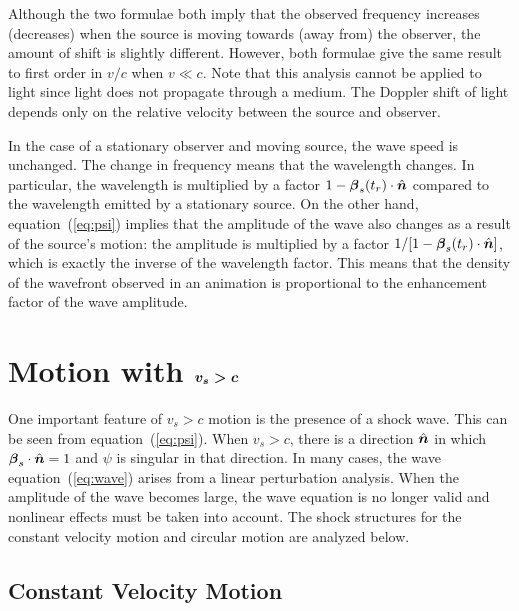 \documentclass[12pt]{article}
\newcommand{\ve}[1]{\mbox{\boldmath $#1$}}
\begin{document}
Although the two formulae both imply that the observed frequency increases (decreases) 
when the source is moving towards (away from) the observer, the 
amount of shift is slightly different. However, both formulae give the same 
result to first order in $v/c$ when $v \ll c$. Note that this analysis cannot 
be applied to light since light does not propagate through a medium. The Doppler 
shift of light depends only on the relative velocity between the source and 
observer.

In the case of a stationary observer and moving source, the wave speed is 
unchanged. The change in frequency means that the wavelength changes. In particular, 
the wavelength is multiplied by a factor $1-\ve{\beta}_s(t_r) \cdot \hat{\ve{n}}$ 
compared to the wavelength emitted by a stationary source. On the other hand, 
equation~(\ref{eq:psi}) implies that the amplitude of the wave also changes as 
a result of the source's motion: the amplitude is multiplied by a factor 
$1/[1-\ve{\beta}_s(t_r) \cdot \hat{\ve{n}}]$, which is exactly the inverse of the 
wavelength factor. This means that the density of the wavefront observed in an animation 
is proportional to the enhancement factor of the wave amplitude.

\section{Motion with $\ve{v_s > c}$}

One important feature of $v_s>c$ motion is the presence of a shock wave. This 
can be seen from equation~(\ref{eq:psi}). When $v_s>c$, there is a direction $\hat{\ve{n}}$ 
in which $\ve{\beta}_s \cdot \hat{\ve{n}}=1$ and $\psi$ is singular in that direction. 
In many cases, the wave equation~(\ref{eq:wave}) arises from a linear perturbation 
analysis. 
When the amplitude of the wave becomes large, the wave equation is no longer valid and 
nonlinear effects must be taken into account. The shock structures for the constant 
velocity motion and circular motion are analyzed below.

\subsection{Constant Velocity Motion}
\end{document}
